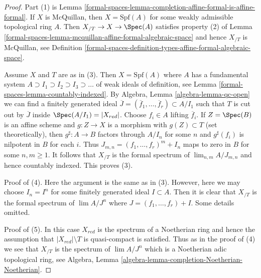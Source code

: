 \begin{proof}
Part (1) is Lemma \ref{formal-spaces-lemma-completion-affine-formal-is-affine-formal}.
If $X$ is McQuillan, then $X = \text{Spf}(A)$ for some weakly admissible
topological ring $A$. Then $X_{/T} \to X \to \Spec(A)$ satisfies
property (2) of Lemma \ref{formal-spaces-lemma-mcquillan-affine-formal-algebraic-space}
and hence $X_{/T}$ is McQuillan, see
Definition \ref{formal-spaces-definition-types-affine-formal-algebraic-space}.

\medskip\noindent
Assume $X$ and $T$ are as in (3).
Then $X = \text{Spf}(A)$ where $A$ has a fundamental system
$A \supset I_1 \supset I_2 \supset I_3 \supset \ldots$
of weak ideals of definition, see Lemma \ref{formal-spaces-lemma-countably-indexed}.
By Algebra, Lemma \ref{algebra-lemma-qc-open}
we can find a finitely generated ideal
$\overline{J} = (\overline{f}_1, \ldots, \overline{f}_r) \subset A/I_1$
such that $T$ is cut out by $\overline{J}$ inside $\Spec(A/I_1) = |X_{red}|$.
Choose $f_i \in A$ lifting $\overline{f}_i$.
If $Z = \Spec(B)$ is an affine scheme and $g : Z \to X$ is
a morphism with $g(Z) \subset T$ (set theoretically), then
$g^\sharp : A \to B$ factors through $A/I_n$ for some $n$
and $g^\sharp(f_i)$ is nilpotent in $B$ for each $i$. Thus
$J_{m, n} = (f_1, \ldots, f_r)^m + I_n$ maps to zero in $B$
for some $n, m \geq 1$. It follows that $X_{/T}$ is the formal spectrum of
$\lim_{n, m} A/J_{m, n}$ and hence countably indexed.
This proves (3).

\medskip\noindent
Proof of (4). Here the argument is the same as in (3).
However, here we may choose $I_n = I^n$ for some finitely generated ideal
$I \subset A$. Then it is clear that $X_{/T}$ is the formal spectrum of
$\lim A/J^n$ where $J = (f_1, \ldots, f_r) + I$. Some details omitted.

\medskip\noindent
Proof of (5). In this case $X_{red}$ is the spectrum of a Noetherian ring
and hence the assumption that $|X_{red}| \setminus T$ is quasi-compact
is satisfied. Thus as in the proof of (4) we see that
$X_{/T}$ is the spectrum of $\lim A/J^n$ which is a Noetherian
adic topological ring, see
Algebra, Lemma \ref{algebra-lemma-completion-Noetherian-Noetherian}.
\end{proof}

